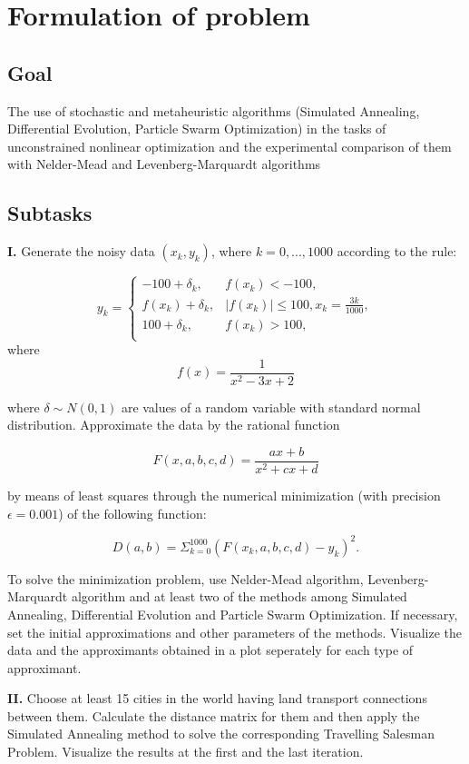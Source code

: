 \section*{Formulation of problem}

\subsection*{Goal}
The use of stochastic and metaheuristic algorithms (Simulated Annealing,
Differential Evolution, Particle Swarm Optimization) in the tasks of unconstrained
nonlinear optimization and the experimental comparison of them with Nelder-Mead
and Levenberg-Marquardt algorithms

\subsection*{Subtasks}
\textbf{I.} Generate the noisy data $(x_k, y_k)$, where $k = 0, ..., 1000$ according to the rule:

\begin{equation*}
    y_k = \begin{cases}
        -100 + \delta_k, & f(x_k) < -100,\\
        f(x_k) + \delta_k, & |f(x_k)| \leq 100, x_k = \frac{3k}{1000}, \\
        100 + \delta_k, & f(x_k) > 100, \\
    \end{cases}
\end{equation*}
where 
\begin{equation*}
    f(x) = \frac{1}{x^2 -3x + 2}
\end{equation*}

where $\delta \sim N(0, 1)$ are values of a random variable with standard normal distribution.
Approximate the data by the rational function

\begin{equation*}
    F(x, a, b, c, d) = \frac{ax + b}{x^2 + cx + d}
\end{equation*}

by means of least squares through the numerical minimization (with precision $\epsilon = 0.001$) of the following function:

\begin{equation*}
    D(a, b) = \Sigma_{k=0}^{1000} (F(x_k, a, b, c, d) - y_k)^2.
\end{equation*}

To solve the minimization problem, use Nelder-Mead algorithm, Levenberg-Marquardt algorithm and at least two of the methods among Simulated Annealing, Differential Evolution and Particle Swarm Optimization. If necessary, set the initial approximations and other parameters of the methods.
Visualize the data and the approximants obtained in a plot seperately for each type of approximant.

\textbf{II.} Choose at least 15 cities in the world having land transport connections between them. Calculate the distance matrix for them and then apply the Simulated Annealing method to solve the corresponding Travelling Salesman Problem. Visualize the results at the first and the last iteration.